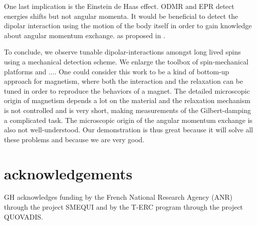 \documentclass[preprintnumbers,amsmath,amssymb,superscriptaddress,twocolumn,showpacs]{revtex4-1}
\begin{document}
One last implication is the Einstein de Haas effect.
ODMR and EPR detect energies shifts but not angular momenta. 
It would be beneficial to detect the dipolar interaction using the motion of the body itself in order to gain knowledge about angular momentum exchange.
as proposed in \cite{Zangara}.

To conclude, we observe tunable dipolar-interactions amongst long lived spins using a mechanical detection scheme.
We enlarge the toolbox of spin-mechanical platforms and ....
One could consider this work to be a kind of bottom-up approach for magnetism, where both the interaction and the relaxation can be tuned in order to reproduce the behaviors of a magnet. 
The detailed microscopic origin of magnetism depends a lot on the material and the relaxation mechanism is not controlled and is very short, making measurements of the  Gilbert-damping a complicated task.
The microscopic origin of the angular momentum exchange is also not well-understood. 
Our demonstration is thus great because it will solve all these problems and because we are very good.

\section*{acknowledgements}
GH acknowledges funding by the French National Research Agency (ANR) through the project SMEQUI and by the T-ERC program through the project QUOVADIS. 


\end{document}
